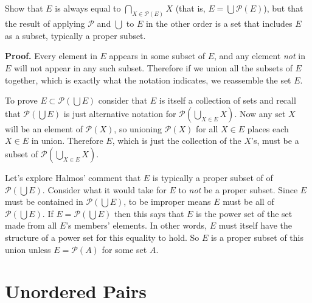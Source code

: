 \documentclass{article}
\begin{document}
\subsection{} Show that $E$ is always equal to $\bigcap_{X \in \mathscr{P}(E)}X$ (that is, $E = \bigcup \mathscr{P}(E)$), but that the result of applying $\mathscr{P}$ and $\bigcup$ to $E$ in the other order is a set that includes $E$ as a subset, typically a proper subset.

\textbf{Proof.} Every element in $E$ appears in some subset of $E$, and any element \textit{not} in $E$ will not appear in any such subset. Therefore if we union all the subsets of $E$ together, which is exactly what the notation indicates, we reassemble the set $E$.

To prove $E \subset \mathscr{P}\left(\bigcup E\right)$ consider that $E$ is itself a collection of sets and recall that $\mathscr{P}\left(\bigcup E\right)$ is just alternative notation for $\mathscr{P}\left(\bigcup_{X \in E} X\right)$. Now any set $X$ will be an element of $\mathscr{P}(X)$, so unioning $\mathscr{P}(X)$ for all $X \in E$ places each $X \in E$ in union. Therefore $E$, which is just the collection of the $X$'s, must be a subset of $\mathscr{P}(\bigcup_{X \in E} X)$. 

Let's explore Halmos' comment that $E$ is typically a proper subset of of $\mathscr{P}\left(\bigcup E\right)$. Consider what it would take for $E$ to \textit{not} be a proper subset. Since $E$ must be contained in $\mathscr{P}\left(\bigcup E\right)$, to be improper means $E$ must be all of $\mathscr{P}\left(\bigcup E\right)$. If $E = \mathscr{P}\left(\bigcup E\right)$ then this says that $E$ is the power set of the set made from all $E$'s members' elements. In other words, $E$ must itself have the structure of a power set for this equality to hold. So $E$ is a proper subset of this union unless $E = \mathscr{P}(A)$ for some set $A$.

\section{Unordered Pairs}
\end{document}
